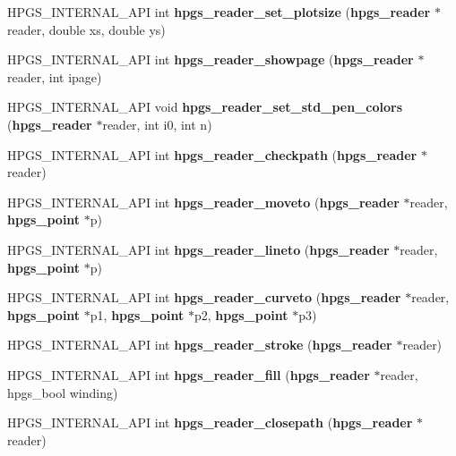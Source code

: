 \begin{CompactItemize}
\item 
HPGS\_\-INTERNAL\_\-API int \textbf{hpgs\_\-reader\_\-set\_\-plotsize} ({\bf hpgs\_\-reader} $\ast$reader, double xs, double ys)\label{group__reader_g7cc94f7b85f7a36aac505caf0a50b999}

\item 
HPGS\_\-INTERNAL\_\-API int \textbf{hpgs\_\-reader\_\-showpage} ({\bf hpgs\_\-reader} $\ast$reader, int ipage)\label{group__reader_g76c2b7dd212ad6e070a402292ad5122b}

\item 
HPGS\_\-INTERNAL\_\-API void \textbf{hpgs\_\-reader\_\-set\_\-std\_\-pen\_\-colors} ({\bf hpgs\_\-reader} $\ast$reader, int i0, int n)\label{group__reader_g483b4e78037cead23625259c92a529f2}

\item 
HPGS\_\-INTERNAL\_\-API int \textbf{hpgs\_\-reader\_\-checkpath} ({\bf hpgs\_\-reader} $\ast$reader)\label{group__reader_gdf06a6ca3a27c7e4bc3dd88be6e31d70}

\item 
HPGS\_\-INTERNAL\_\-API int \textbf{hpgs\_\-reader\_\-moveto} ({\bf hpgs\_\-reader} $\ast$reader, {\bf hpgs\_\-point} $\ast$p)\label{group__reader_g6b513e1487735f80cc5c8ae95b81f8ec}

\item 
HPGS\_\-INTERNAL\_\-API int \textbf{hpgs\_\-reader\_\-lineto} ({\bf hpgs\_\-reader} $\ast$reader, {\bf hpgs\_\-point} $\ast$p)\label{group__reader_g09a8bc8661fdc23551f476a77397c567}

\item 
HPGS\_\-INTERNAL\_\-API int \textbf{hpgs\_\-reader\_\-curveto} ({\bf hpgs\_\-reader} $\ast$reader, {\bf hpgs\_\-point} $\ast$p1, {\bf hpgs\_\-point} $\ast$p2, {\bf hpgs\_\-point} $\ast$p3)\label{group__reader_g162d23e7cf5ce4651e71134865e85120}

\item 
HPGS\_\-INTERNAL\_\-API int \textbf{hpgs\_\-reader\_\-stroke} ({\bf hpgs\_\-reader} $\ast$reader)\label{group__reader_g0b36071af0bf02444c2610401d59b3b9}

\item 
HPGS\_\-INTERNAL\_\-API int \textbf{hpgs\_\-reader\_\-fill} ({\bf hpgs\_\-reader} $\ast$reader, hpgs\_\-bool winding)\label{group__reader_gbb6d9e05bfbcf4b99ae389bc23f3e1c6}

\item 
HPGS\_\-INTERNAL\_\-API int \textbf{hpgs\_\-reader\_\-closepath} ({\bf hpgs\_\-reader} $\ast$reader)\label{group__reader_g58959cd98027b41a3abc3a90920e6a88}


\end{CompactItemize}
